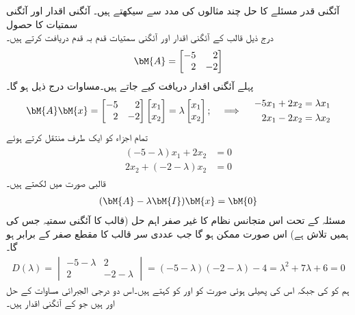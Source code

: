 آئگنی قدر مسئلے کا حل چند مثالوں کی مدد سے سیکھتے ہیں۔
\quad آئگنی اقدار اور آئگنی سمتیات کا حصول\\
درج ذیل قالب کے آئگنی اقدار اور آئگنی سمتیات قدم بہ قدم دریافت کرتے ہیں۔
\begin{align*}
\bM{A}=\begin{bmatrix*}[r] -5&2\\2&-2 \end{bmatrix*}
\end{align*}
پہلے آئگنی اقدار دریافت کیے جاتے ہیں۔مساوات  درج ذیل ہو گا۔
\begin{gather*}
\bM{A}\bM{x}=\begin{bmatrix*}[r] -5&2\\2&-2 \end{bmatrix*}\begin{bmatrix} x_1\\x_2 \end{bmatrix}=\lambda \begin{bmatrix} x_1\\x_2 \end{bmatrix};\quad \implies \quad \begin{aligned}-5x_1+2x_2&=\lambda x_1\\ 2x_1-2x_2&=\lambda x_2\end{aligned}
\end{gather*}
تمام اجزاء کو ایک طرف منتقل کرتے ہوئے
\begin{gather}
\begin{aligned}\label{مساوات_آئگنی_مثال_الف}
(-5-\lambda)x_1+2x_2&=0\\
2x_2+(-2-\lambda)x_2&=0
\end{aligned}
\end{gather}
قالبی صورت میں لکھتے ہیں۔
\begin{align*}
(\bM{A}-\lambda \bM{I})\bM{x}=\bM{0}
\end{align*}
مسئلہ  کے تحت اس متجانس نظام کا غیر صفر اہم حل  (قالب  کا آئگنی سمتیہ جس کی ہمیں تلاش ہے)  اس صورت ممکن ہو گا جب عددی سر قالب کا مقطع صفر کے برابر ہو گا۔
\begin{align*}
D(\lambda)=\begin{vmatrix} -5-\lambda& 2\\ 2 & -2-\lambda \end{vmatrix}=(-5-\lambda)(-2-\lambda)-4=\lambda^2+7\lambda+6=0
\end{align*}
ہم  کو  کی  جبکہ اس کی پھیلی  ہوئی صورت کو  اور  کو  کہتے ہیں۔اس دو درجی الجبرائی مساوات کے حل  اور  ہیں جو  کے آئگنی اقدار ہیں۔

